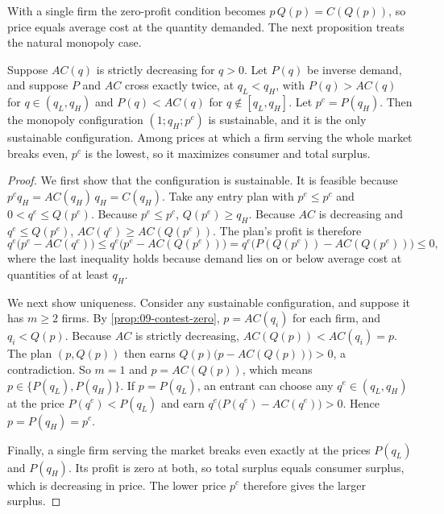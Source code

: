 With a single firm the zero-profit condition becomes $p\,Q(p) = C(Q(p))$, so price equals average cost at the
quantity demanded. The next proposition treats the natural monopoly case.

\begin{proposition}\label{prop:09-contest-monopoly}
Suppose $AC(q)$ is strictly decreasing for $q > 0$. Let $P(q)$ be inverse demand, and suppose $P$ and $AC$ cross
exactly twice, at $q_L < q_H$, with $P(q) > AC(q)$ for $q \in (q_L, q_H)$ and $P(q) < AC(q)$ for
$q \notin [q_L, q_H]$. Let $p^c = P(q_H)$. Then the monopoly configuration $(1; q_H; p^c)$ is sustainable, and it
is the only sustainable configuration. Among prices at which a firm serving the whole market breaks even,
$p^c$ is the lowest, so it maximizes consumer and total surplus.
\end{proposition}

\begin{proof}
We first show that the configuration is sustainable. It is feasible because $p^c q_H = AC(q_H)\,q_H = C(q_H)$. Take any
entry plan with $p^e \le p^c$ and $0 < q^e \le Q(p^e)$. Because $p^e \le p^c$, $Q(p^e) \ge q_H$. Because $AC$ is
decreasing and $q^e \le Q(p^e)$, $AC(q^e) \ge AC(Q(p^e))$. The plan's profit is therefore
\begin{equation*}
  q^e\big(p^e - AC(q^e)\big) \le q^e\big(p^e - AC(Q(p^e))\big)
  = q^e\big(P(Q(p^e)) - AC(Q(p^e))\big) \le 0,
\end{equation*}
where the last inequality holds because demand lies on or below average cost at quantities of at least $q_H$.

We next show uniqueness. Consider any sustainable configuration, and suppose it has $m \ge 2$ firms. By
\cref{prop:09-contest-zero}, $p = AC(q_i)$ for each firm, and $q_i < Q(p)$. Because $AC$ is strictly decreasing,
$AC(Q(p)) < AC(q_i) = p$. The plan $(p, Q(p))$ then earns $Q(p)\big(p - AC(Q(p))\big) > 0$, a contradiction.
So $m = 1$ and $p = AC(Q(p))$, which means $p \in \{P(q_L), P(q_H)\}$. If $p = P(q_L)$, an entrant can choose
any $q^e \in (q_L, q_H)$ at the price $P(q^e) < P(q_L)$ and earn $q^e\big(P(q^e) - AC(q^e)\big) > 0$. Hence
$p = P(q_H) = p^c$.

Finally, a single firm serving the market breaks even exactly at the prices $P(q_L)$ and $P(q_H)$. Its
profit is zero at both, so total surplus equals consumer surplus, which is decreasing in price. The lower
price $p^c$ therefore gives the larger surplus.
\end{proof}

